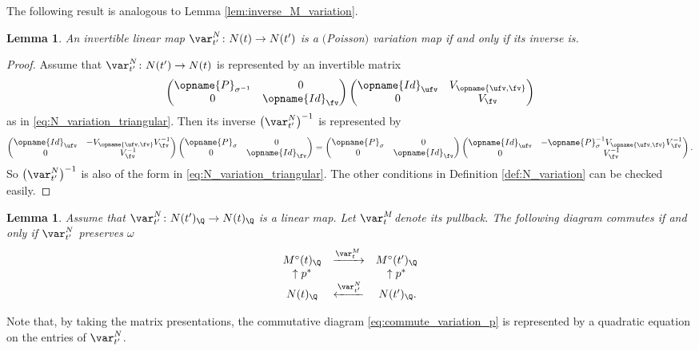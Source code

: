 \documentclass[pdftex]{sigma}
\newcommand{\Mc}{M^\circ}
\newcommand{\Id}{{\opname{Id}}}
\newcommand{\trans}{\opname{P}}
\newcommand{\high}{\opname{\ufv,\fv}}
\numberwithin{equation}{section}
\newtheorem{Lemma}[Theorem]{Lemma}
\begin{document}
The following result is analogous to Lemma \ref{lem:inverse_M_variation}.

\begin{Lemma}\label{lem:inverse_N_variation}
An invertible linear map $\var_{t'}^{N}\colon N(t)\rightarrow N(t')$ is
a $($Poisson$)$ variation map if and only if its inverse is.
\end{Lemma}

\begin{proof}
Assume that $\var_{t'}^{N}\colon N(t')\rightarrow N(t)$ is represented
by an invertible matrix \[\begin{pmatrix}
\trans_{\sigma^{-1}} & 0\\
0 & \Id_{\fv}
\end{pmatrix}\begin{pmatrix}
\Id_{\ufv} & V_{\high}\\
0 & V_{\fv}
\end{pmatrix}\] as in \ref{eq:N_variation_triangular}. Then its inverse $\bigl(\var_{t'}^{N}\bigr)^{-1}$
is represented by \[\begin{pmatrix}
\Id_{\ufv} & -V_{\high}V_{\fv}^{-1}\\
0 & V_{\fv}^{-1}
\end{pmatrix}\begin{pmatrix}
\trans_{\sigma} & 0\\
0 & \Id_{\fv}
\end{pmatrix}=\begin{pmatrix}
\trans_{\sigma} & 0\\
0 & \Id_{\fv}
\end{pmatrix}\begin{pmatrix}
\Id_{\ufv} & -\trans_{\sigma}^{-1}V_{\high}V_{\fv}^{-1}\\
0 & V_{\fv}^{-1}
\end{pmatrix}.\] So $\bigl(\var_{t'}^{N}\bigr)^{-1}$ is also of the form in \eqref{eq:N_variation_triangular}.
The other conditions in Definition \ref{def:N_variation} can be checked
easily.
\end{proof}

\begin{Lemma}\label{lem:commute_variation_p}
Assume that $\var_{t'}^{N}\colon N(t')_{\Q}\rightarrow N(t)_{\Q}$ is a
linear map. Let $\var_{t}^{M}$denote its pullback. The following
diagram commutes if and only if $\var_{t'}^{N}$ preserves $\omega$
\begin{align}
\begin{array}{ccc}
\Mc(t)_{\Q} & \xrightarrow{\var_{t}^{M}} & \Mc(t')_{\Q}\\
\uparrow p^{*} & & \uparrow p^{*}\\
N(t)_{\Q} & \xleftarrow{\var_{t'}^{N}} & \,N(t')_{\Q}.
\end{array}\label{eq:commute_variation_p}
\end{align}
\end{Lemma}
Note that, by taking the matrix presentations, the commutative diagram \eqref{eq:commute_variation_p} is represented by a quadratic equation on the entries of $\var_{t'}^N$.
\end{document}
